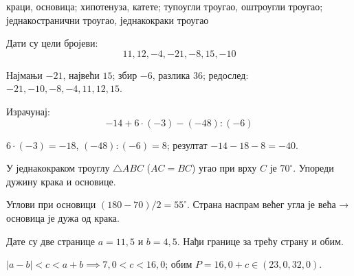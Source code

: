 \documentclass[10pt,a5paper,addpoints]{exam}
\begin{document}
\begin{questions}
\begin{solution}[\stretch 2]
краци, основица; хипотенуза, катете; тупоугли троугао, оштроугли троугао; једнакостранични троугао, једнакокраки троугао
\end{solution}

\question
Дати су цели бројеви:
\[
11,12,-4,-21,-8,15,-10
\]

\begin{solution}[\stretch 2]
Најмањи $-21$, највећи $15$; збир $-6$, разлика $36$; редослед: $-21,-10,-8,-4,11,12,15$.
\end{solution}

\question[3]
Израчунај:
\[
-14 + 6\cdot(-3) - (-48):(-6)
\]

\begin{solution}[\stretch 2]
$6\cdot(-3)=-18$, $(-48):(-6)=8$; резултат $-14-18-8=-40$.
\end{solution}

\ifprintanswers\else\newpage\fi

\question
У једнакокраком троуглу $\triangle ABC$ ($AC=BC$) угао при врху $C$ је $70^\circ$. Упореди дужину крака и основице.

\begin{solution}[\stretch 2]
Углови при основици $(180-70)/2=55^\circ$. Страна наспрам већег угла је већа → основица је дужа од крака.
\end{solution}

\question
Дате су две странице $a=11{,}5$ и $b=4{,}5$. Нађи границе за трећу страну и обим.

\begin{solution}[\stretch 2]
$|a-b|<c<a+b \implies 7{,}0<c<16{,}0$; обим $P=16{,}0+c\in(23{,}0,32{,}0)$.
\end{solution}

\end{questions}
\end{document}

